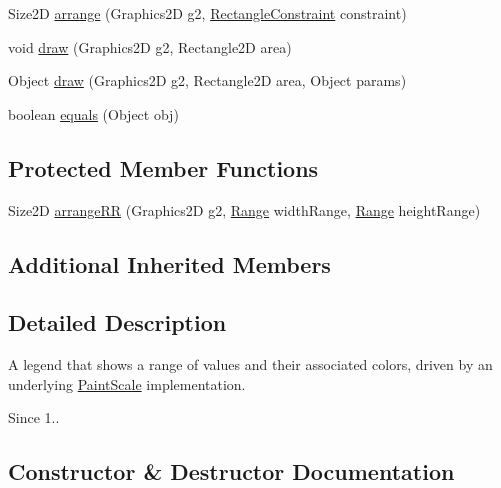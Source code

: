 \begin{DoxyCompactItemize}
\item 
Size2D \mbox{\hyperlink{classorg_1_1jfree_1_1chart_1_1title_1_1_paint_scale_legend_a893860f6362afa2f5e22dd1b0ff301f7}{arrange}} (Graphics2D g2, \mbox{\hyperlink{classorg_1_1jfree_1_1chart_1_1block_1_1_rectangle_constraint}{Rectangle\+Constraint}} constraint)
\item 
void \mbox{\hyperlink{classorg_1_1jfree_1_1chart_1_1title_1_1_paint_scale_legend_a90920adb948108b694a0fc169085b6e3}{draw}} (Graphics2D g2, Rectangle2D area)
\item 
Object \mbox{\hyperlink{classorg_1_1jfree_1_1chart_1_1title_1_1_paint_scale_legend_ac2571d0f330c72c18821cfc2552a6e57}{draw}} (Graphics2D g2, Rectangle2D area, Object params)
\item 
boolean \mbox{\hyperlink{classorg_1_1jfree_1_1chart_1_1title_1_1_paint_scale_legend_af5fb515da90fde42d1ef84914a2ae494}{equals}} (Object obj)
\end{DoxyCompactItemize}
\subsection*{Protected Member Functions}
\begin{DoxyCompactItemize}
\item 
Size2D \mbox{\hyperlink{classorg_1_1jfree_1_1chart_1_1title_1_1_paint_scale_legend_a2820db9ece0205df7de815a05a2aec53}{arrange\+RR}} (Graphics2D g2, \mbox{\hyperlink{classorg_1_1jfree_1_1data_1_1_range}{Range}} width\+Range, \mbox{\hyperlink{classorg_1_1jfree_1_1data_1_1_range}{Range}} height\+Range)
\end{DoxyCompactItemize}
\subsection*{Additional Inherited Members}


\subsection{Detailed Description}
A legend that shows a range of values and their associated colors, driven by an underlying \mbox{\hyperlink{}{Paint\+Scale}} implementation.

\begin{DoxySince}{Since}
1.. 
\end{DoxySince}


\subsection{Constructor \& Destructor Documentation}
\mbox{\label{classorg_1_1jfree_1_1chart_1_1title_1_1_paint_scale_legend_aa283014dc8b36eb6eb754705660866b7}} 
